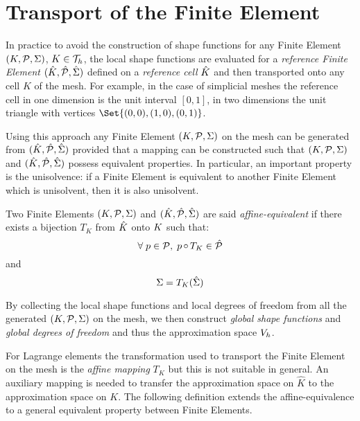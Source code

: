 \section{Transport of the Finite Element}

In practice to avoid the construction of shape functions for any Finite Element ${({K},{\mathcal P}, {\Sigma})}$, $K \in {\mathcal T}_h$, the local shape functions are evaluated for a \textit{reference Finite Element} ${({\hat {{K}}},{\hat {{\mathcal P}}}, {\hat{{\Sigma}}})}$ defined on a \textit{reference cell} ${\hat {{K}}}$ and then transported onto any cell $K$ of the mesh.
For example, in the case of simplicial meshes the reference cell in one dimension is the unit interval $[0,1]$, in two dimensions the unit triangle with vertices $\Set{(0,0),(1,0),(0,1)}$.

\medskip
Using this approach any Finite Element ${({K},{\mathcal P}, {\Sigma})}$ on the mesh can be generated from ${({\hat {{K}}},{\hat {{\mathcal P}}}, {\hat{{\Sigma}}})}$ provided that a mapping can be constructed such that ${({K},{\mathcal P}, {\Sigma})}$ and ${({\hat {{K}}},{\hat {{\mathcal P}}}, {\hat{{\Sigma}}})}$ possess equivalent properties.
In particular, an important property is the unisolvence: if a Finite Element is equivalent to another Finite Element which is unisolvent, then it is also unisolvent.

\begin{dfntn}
Two Finite Elements ${({K},{\mathcal P}, {\Sigma})}$ and ${({\hat {{K}}},{\hat {{\mathcal P}}}, {\hat{{\Sigma}}})}$ are said \textit{affine-equivalent} if there exists a bijection $T_K$ from ${\hat {{K}}}$ onto ${K}$  such that:
\begin{equation*}
{\forall\;} p \in {\mathcal P},\; p\mathop\circ T_K \in {\hat {{\mathcal P}}}
\end{equation*}
and
\begin{equation*}
\Sigma = T_K({\hat{{\Sigma}}})
\end{equation*}
\end{dfntn}

\medskip
By collecting the local shape functions and local degrees of freedom from all the generated ${({K},{\mathcal P}, {\Sigma})}$ on the mesh, we then construct \textit{global shape functions} and \textit{global degrees of freedom} and thus the approximation space ${{V}}_h$.

\medskip
For Lagrange elements the transformation used to transport the Finite Element on the mesh is the \textit{affine mapping} $T_K$ but this is not suitable in general.
An auxiliary mapping is needed to transfer the approximation space on $\hat K$ to the approximation space on $K$.
The following definition extends the affine-equivalence to a general equivalent property between Finite Elements.

